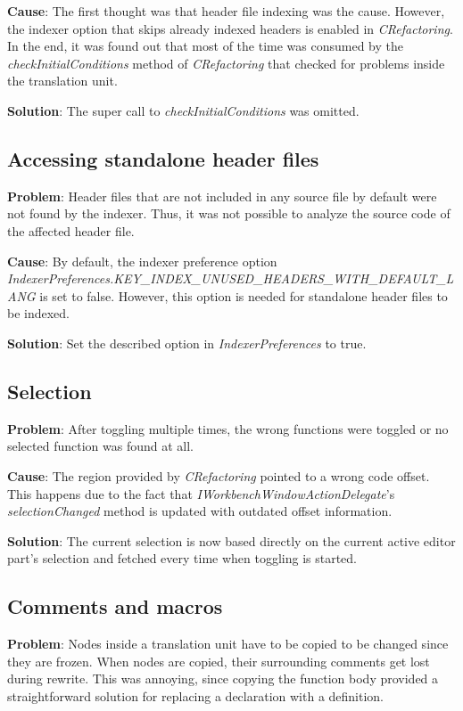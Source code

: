 \textbf{Cause}: The first thought was that header file indexing was the cause. 
However, the indexer option that skips already indexed headers is enabled in 
\textit{CRefactoring}. In the end, it was found out that most of the time was 
consumed by the \textit{checkInitialConditions} method of \textit{CRefactoring} 
that checked for problems inside the translation unit.

\textbf{Solution}: The super call to \textit{checkInitialConditions} was omitted.

\subsection{Accessing standalone header files}
\textbf{Problem}: Header files that are not included in any source file by 
default were not found by the indexer. Thus, it was not possible to analyze the 
source code of the affected header file.

\textbf{Cause}: By default, the indexer preference option 
\textit{IndexerPreferences.KEY\_INDEX\_UNUSED\_HEADERS\_WITH\_DEFAULT\_LANG} is 
set to false. However, this option is needed for standalone header files to be 
indexed.

\textbf{Solution}: Set the described option in \textit{IndexerPreferences} to 
true.

\subsection{Selection}
\textbf{Problem}: After toggling multiple times, the wrong functions were 
toggled or no selected function was found at all. 

\textbf{Cause}: The region provided by \textit{CRefactoring} pointed to a wrong 
code offset. This happens due to the fact that 
\textit{IWorkbenchWindowActionDelegate}'s \textit{selectionChanged} method is 
updated with outdated offset information.

\textbf{Solution}: The current selection is now based directly on the current 
active editor part's selection and fetched every time when toggling is started.

\subsection{Comments and macros}
\textbf{Problem}: Nodes inside a translation unit have to be copied to be 
changed since they are frozen. When nodes are copied, their surrounding comments 
get lost during rewrite\cite{Sommerlad:2008:RCR:1449814.1449817}. This was
annoying, since copying the function body provided a straightforward solution
for replacing a declaration with a definition.

